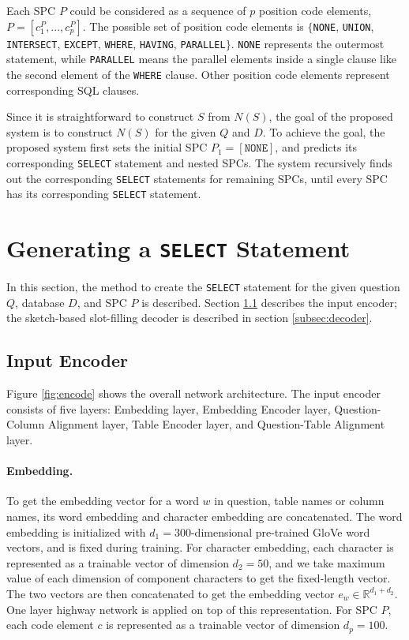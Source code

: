 \documentclass[11pt,a4paper]{article}
\begin{document}
Each SPC $P$ could be considered as a sequence of $p$ position code elements, $P = [ c^P_1, ..., c^P_p ]$. The possible set of position code elements is $\{$\texttt{NONE}, \texttt{UNION}, \texttt{INTERSECT}, \texttt{EXCEPT}, \texttt{WHERE}, \texttt{HAVING}, \texttt{PARALLEL}$\}$. \texttt{NONE} represents the outermost statement, while \texttt{PARALLEL} means the parallel elements inside a single clause like the second element of the \texttt{WHERE} clause. Other position code elements represent corresponding SQL clauses.

Since it is straightforward to construct $S$ from $N(S)$, the goal of the proposed system is to construct $N(S)$ for the given $Q$ and $D$. To achieve the goal, the proposed system first sets the initial SPC $P_1=[\texttt{NONE}]$, and predicts its corresponding \texttt{SELECT} statement and nested SPCs. The system recursively finds out the corresponding \texttt{SELECT} statements for remaining SPCs, until every SPC has its corresponding \texttt{SELECT} statement. 

\section{Generating a \texttt{SELECT} Statement}
\label{sec:genselect}

In this section, the method to create the \texttt{SELECT} statement for the given question $Q$, database $D$, and SPC $P$ is described. Section \ref{subsec:encoder} describes the input encoder; the sketch-based slot-filling decoder is described in section \ref{subsec:decoder}.

\subsection{Input Encoder}
\label{subsec:encoder}

Figure \ref{fig:encode} shows the overall network architecture. The input encoder consists of five layers: Embedding layer, Embedding Encoder layer, Question-Column Alignment layer, Table Encoder layer, and Question-Table Alignment layer. 

\paragraph{Embedding.} To get the embedding vector for a word $w$ in question, table names or column names, its word embedding and character embedding are concatenated. The word embedding is initialized with $d_1 = 300$-dimensional pre-trained GloVe \citep{pennington14} word vectors, and is fixed during training. For character embedding, each character is represented as a trainable vector of dimension $d_2 = 50$, and we take maximum value of each dimension of component characters to get the fixed-length vector. The two vectors are then concatenated to get the embedding vector $e_w \in \mathbb{R}^{d_1 + d_2}$.  One layer highway network \citep{highway} is applied on top of this representation. For SPC $P$, each code element  $c$ is represented as a trainable vector of dimension $d_p = 100$. 
\end{document}
